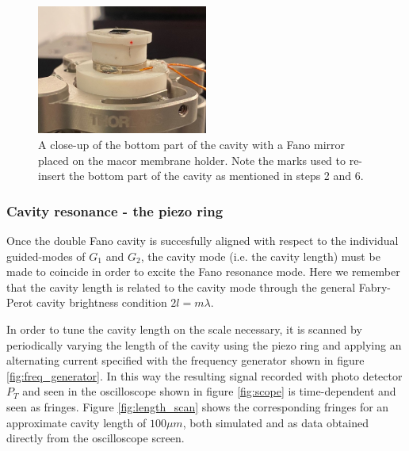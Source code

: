 \begin{figure}[h!]
    \centering
    \includegraphics[width=0.5\textwidth]{figures/bottom_with_alignement_mark.pdf}
    \caption{A close-up of the bottom part of the cavity with a Fano mirror placed on the macor membrane holder. Note the marks used to re-insert the bottom part of the cavity as mentioned in steps 2 and 6.}
    \label{fig:bottom_with_alignment_mark}
\end{figure}

\subsubsection{Cavity resonance - the piezo ring}

Once the double Fano cavity is succesfully aligned with respect to the individual guided-modes of $G_1$ and $G_2$, the cavity mode (i.e. the cavity length) must be made to coincide in order to excite the Fano resonance mode. Here we remember that the cavity length is related to the cavity mode through the general Fabry-Perot cavity brightness condition $2 l = m \lambda$. 

In order to tune the cavity length on the scale necessary, it is scanned by periodically varying the length of the cavity using the piezo ring and applying an alternating current specified with the frequency generator shown in figure \ref{fig:freq_generator}. In this way the resulting signal recorded with photo detector $P_T$ and seen in the oscilloscope shown in figure \ref{fig:scope} is time-dependent and seen as fringes. Figure \ref{fig:length_scan} shows the corresponding fringes for an approximate cavity length of $100 \mu m$, both simulated and as data obtained directly from the oscilloscope screen.

